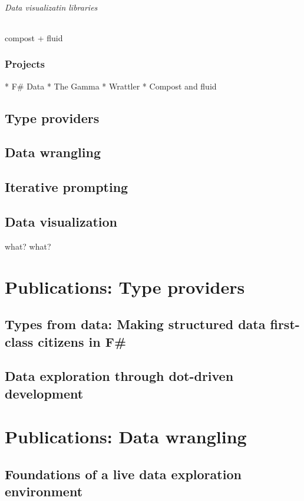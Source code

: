 \documentclass[fleqn,11pt]{report}
\begin{document}
\paragraph{Data visualizatin libraries}
compost + fluid

\section{Projects}

* F\# Data
* The Gamma
* Wrattler
* Compost and fluid


\chapter{Type providers}
\chapter{Data wrangling}
\chapter{Iterative prompting}
\chapter{Data visualization}

what?
what?


\part{Publications: Type providers}

\chapter{Types from data: Making structured data first-class citizens in F\#}
\chapter{Data exploration through dot-driven development}

\part{Publications: Data wrangling}

\chapter{Foundations of a live data exploration environment}
\end{document}
